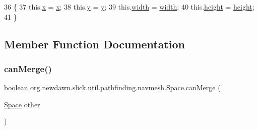 \begin{DoxyCode}
36                                                               \{
37         this.\mbox{\hyperlink{classorg_1_1newdawn_1_1slick_1_1util_1_1pathfinding_1_1navmesh_1_1_space_a314d8d0ed7351fbaaa0a191464e26bfc}{x}} = \mbox{\hyperlink{classorg_1_1newdawn_1_1slick_1_1util_1_1pathfinding_1_1navmesh_1_1_space_a314d8d0ed7351fbaaa0a191464e26bfc}{x}};
38         this.\mbox{\hyperlink{classorg_1_1newdawn_1_1slick_1_1util_1_1pathfinding_1_1navmesh_1_1_space_ad394b749482835dc1430efff0321010e}{y}} = \mbox{\hyperlink{classorg_1_1newdawn_1_1slick_1_1util_1_1pathfinding_1_1navmesh_1_1_space_ad394b749482835dc1430efff0321010e}{y}};
39         this.\mbox{\hyperlink{classorg_1_1newdawn_1_1slick_1_1util_1_1pathfinding_1_1navmesh_1_1_space_a503d0a0778ebcb12877f5c432aa97698}{width}} = \mbox{\hyperlink{classorg_1_1newdawn_1_1slick_1_1util_1_1pathfinding_1_1navmesh_1_1_space_a503d0a0778ebcb12877f5c432aa97698}{width}};
40         this.\mbox{\hyperlink{classorg_1_1newdawn_1_1slick_1_1util_1_1pathfinding_1_1navmesh_1_1_space_a2214b5226eed20766ff61fc3f9803a58}{height}} = \mbox{\hyperlink{classorg_1_1newdawn_1_1slick_1_1util_1_1pathfinding_1_1navmesh_1_1_space_a2214b5226eed20766ff61fc3f9803a58}{height}};
41     \}
\end{DoxyCode}


\subsection{Member Function Documentation}
\mbox{\label{classorg_1_1newdawn_1_1slick_1_1util_1_1pathfinding_1_1navmesh_1_1_space_a87cd86ad6911e8a912c2c87c78726505}} 
\subsubsection{\texorpdfstring{can\+Merge()}{canMerge()}}
{\footnotesize\ttfamily boolean org.\+newdawn.\+slick.\+util.\+pathfinding.\+navmesh.\+Space.\+can\+Merge (\begin{DoxyParamCaption}\item[{\mbox{\hyperlink{classorg_1_1newdawn_1_1slick_1_1util_1_1pathfinding_1_1navmesh_1_1_space}{Space}}}]{other }\end{DoxyParamCaption})\hspace{0.3cm}{\ttfamily [inline]}}

